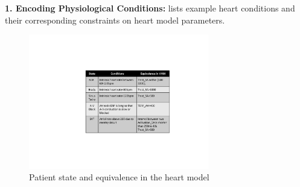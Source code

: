 \noindent
\textbf{1. Encoding Physiological Conditions:}   lists example heart conditions and their corresponding constraints on heart model parameters.
\begin{figure}[!t]
	\center
	\includegraphics[width=0.70\textwidth]{figs/state.pdf}
	\center
	\vspace{-10pt}	
	\caption{Patient state and equivalence in the heart model}
	\vspace{-10pt}	
	\label{fig:state}
\end{figure}

